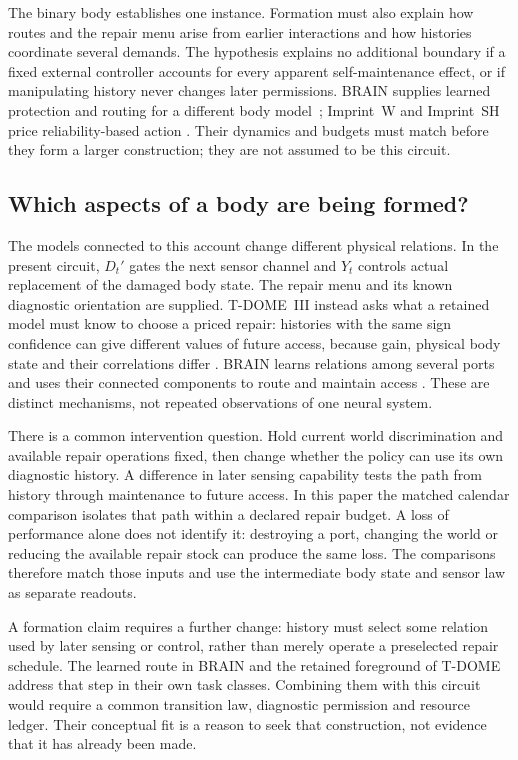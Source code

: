 \documentclass[11pt,a4paper]{article}
\begin{document}
The binary body establishes one instance. Formation must also explain
how routes and the repair menu arise from earlier interactions and how
histories coordinate several demands. The hypothesis explains no
additional boundary if a fixed external controller accounts for every
apparent self-maintenance effect, or if manipulating history never
changes later permissions. BRAIN supplies learned protection and
routing for a different body model~\cite{LiuBrainAnchor};
Imprint~W and Imprint~SH price reliability-based action
\cite{LiuWorldImprint,LiuImprintSH}. Their dynamics and budgets must
match before they form a larger construction; they are not assumed
to be this circuit.

\subsection{Which aspects of a body are being formed?}

The models connected to this account change different physical relations.
In the present circuit, $D_t'$ gates the next sensor channel and $Y_t$
controls actual replacement of the damaged body state. The repair menu
and its known diagnostic orientation are supplied.
T-DOME~III instead asks what a retained model must know to choose a
priced repair: histories with the same sign confidence can give
different values of future access, because gain, physical body state
and their correlations differ \cite{Liu2026TDOME_III}.
BRAIN learns relations among several ports and uses their connected
components to route and maintain access \cite{LiuBrainAnchor}.
These are distinct mechanisms, not repeated observations of one
neural system.

There is a common intervention question. Hold current world
discrimination and available repair operations fixed, then change
whether the policy can use its own diagnostic history. A difference
in later sensing capability tests the path from history through
maintenance to future access. In this paper the matched calendar
comparison isolates that path within a declared repair budget.
A loss of performance alone does not identify it: destroying a port,
changing the world or reducing the available repair stock can produce
the same loss. The comparisons therefore match those inputs and use
the intermediate body state and sensor law as separate readouts.

A formation claim requires a further change: history must select
some relation used by later sensing or control, rather than merely
operate a preselected repair schedule. The learned route in BRAIN
and the retained foreground of T-DOME address that step in their own
task classes. Combining them with this circuit would require a common
transition law, diagnostic permission and resource ledger. Their
conceptual fit is a reason to seek that construction, not evidence
that it has already been made.
\end{document}
